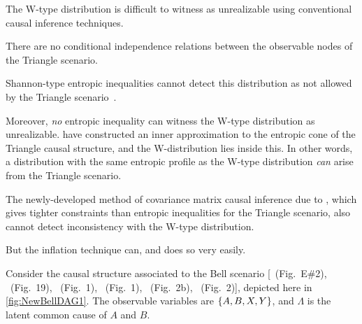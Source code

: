 
The W-type distribution is difficult to witness as unrealizable using conventional causal inference techniques.
\begin{compactenum}
\item There are no conditional independence relations between the observable nodes of the Triangle scenario. %
\item Shannon-type entropic inequalities cannot detect this distribution as not allowed by the Triangle scenario~\cite{fritz2013marginal,chaves2014novel,chaves2014informationinference}. 
\item Moreover, \emph{no} entropic inequality can witness the W-type distribution as unrealizable. \citet{weilenmann2016entropic} have constructed an inner approximation to the entropic cone of the Triangle causal structure, and the W-distribution lies inside this. In other words, a distribution with the same entropic profile as the W-type distribution \emph{can} arise from the Triangle scenario.
\item The newly-developed method of covariance matrix causal inference due to \citet{kela2016covariance}, which gives tighter constraints than entropic inequalities for the Triangle scenario, also cannot detect inconsistency with the W-type distribution.
\end{compactenum}
\par\noindent But the inflation technique can, and does so very easily.

\par\smallskip\nobreak

Consider the causal structure associated to the Bell \cite{bell1964einstein,Brunner2013Bell,bell1966lhvm,CHSHOriginal} scenario [\citealp{pusey2014gdag}~(Fig.~E\#2), \citealp{WoodSpekkens}~(Fig.~19), \citealp{chaves2014novel}~(Fig.~1), \citealp{BeyondBellII}~(Fig.~1), \citealp{wolfe2015nonconvexity}~(Fig.~2b), \citealp{steeg2011relaxation}~(Fig.~2)], depicted here in \cref{fig:NewBellDAG1}. The observable variables are $\left\lbrace A,B,X,Y\right\rbrace$, and $\Lambda$ is the latent common cause of $A$ and $B$. 

